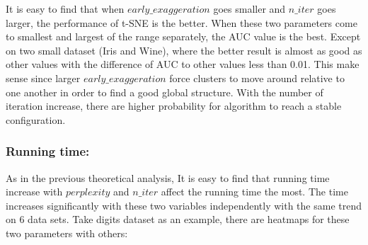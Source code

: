 \noindent It is easy to find that when $early\_exaggeration$ goes smaller and $n\_iter$ goes larger, the performance of t-SNE is the better. When these two parameters come to smallest and largest of the range separately, the AUC value is the best. Except on two small dataset (Iris and Wine), where the better result is almost as good as other values with the difference of AUC to other values less than 0.01. This make sense since larger $early\_exaggeration$ force clusters to move around relative to one another in order to find a good global structure. With the number of iteration increase, there are higher probability for algorithm to reach a stable configuration.


\subsubsection{Running time:}

As in the previous theoretical analysis,  It is easy to find that running time increase with $perplexity$ and $n\_iter$ affect the running time the most. The time increases significantly with these two variables independently with the same trend on 6 data sets. Take digits dataset as an example, there are heatmaps for these two parameters with others:

